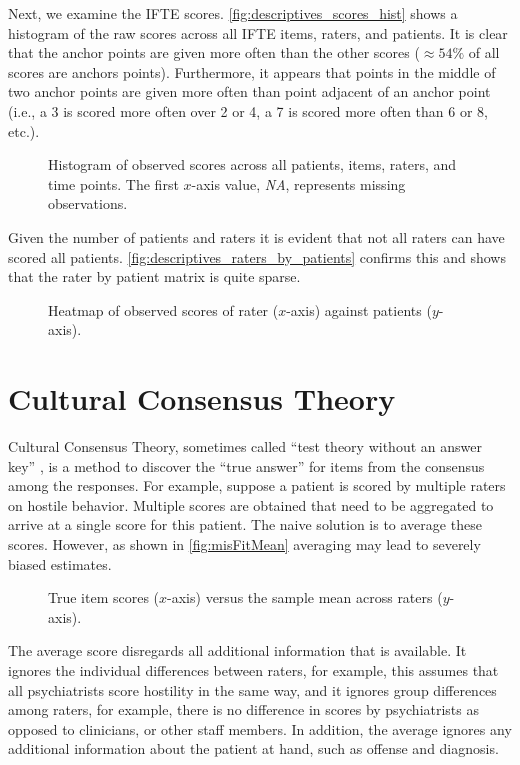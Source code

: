 \documentclass[a4paper,11pt]{article}
\newcommand{\DB}[1]{\todo[inline, color=colorDon,caption={}]{DB: {#1}}}
\begin{document}
Next, we examine the IFTE scores. 
\autoref{fig:descriptives_scores_hist} shows a histogram of the raw scores across all IFTE items, raters, and patients.
It is clear that the anchor points are given more often than the other scores ($\approx54\%$ of all scores are anchors points).
Furthermore, it appears that points in the middle of two anchor points are given more often than point adjacent of an anchor point (i.e., a 3 is scored more often over 2 or 4, a 7 is scored more often than 6 or 8, etc.).
\begin{figure}[!ht]
	\centering
	
	\caption{Histogram of observed scores across all patients, items, raters, and time points. The first $x$-axis value, \emph{NA}, represents missing observations.}
	\label{fig:descriptives_scores_hist}
\end{figure}
Given the number of patients and raters it is evident that not all raters can have scored all patients.
\autoref{fig:descriptives_raters_by_patients} confirms this and shows that the rater by patient matrix is quite sparse.
\begin{figure}[!ht]
	\centering
	
	\caption{Heatmap of observed scores of rater ($x$-axis) against patients ($y$-axis).}
	\label{fig:descriptives_raters_by_patients}
\end{figure}



\section{Cultural Consensus Theory}

Cultural Consensus Theory, sometimes called ``test theory without an answer key'' \parencite{batchelder1988test}, is a method to discover the ``true answer'' for items from the consensus among the responses.
For example, suppose a patient is scored by multiple raters on hostile behavior.
Multiple scores are obtained that need to be aggregated to arrive at a single score for this patient.
The naive solution is to average these scores.
However, as shown in \autoref{fig:misFitMean} averaging may lead to severely biased estimates.
\begin{figure}[!ht]
	\centering
	
	\caption{True item scores ($x$-axis) versus the sample mean across raters ($y$-axis).}
	\label{fig:misFitMean}
\end{figure}
\DB{\autoref{fig:misFitMean} is not convincing!}
The average score disregards all additional information that is available.
It ignores the individual differences between raters, for example, this assumes that all psychiatrists score hostility in the same way, and it ignores group differences among raters, for example, there is no difference in scores by psychiatrists as opposed to clinicians, or other staff members.
In addition, the average ignores any additional information about the patient at hand, such as offense and diagnosis.
\end{document}

